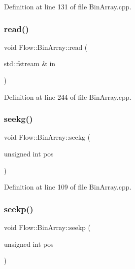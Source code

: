Definition at line 131 of file Bin\+Array.\+cpp.

\hypertarget{class_flow_1_1_bin_array_aa27012674a47706286b91b827599df43}{}\label{class_flow_1_1_bin_array_aa27012674a47706286b91b827599df43} 
\subsubsection{\texorpdfstring{read()}{read()}}
{\footnotesize\ttfamily void Flow\+::\+Bin\+Array\+::read (\begin{DoxyParamCaption}\item[{std\+::fstream \&}]{in }\end{DoxyParamCaption})}



Definition at line 244 of file Bin\+Array.\+cpp.

\hypertarget{class_flow_1_1_bin_array_a81034d4e23c65e830ac7126e2a715097}{}\label{class_flow_1_1_bin_array_a81034d4e23c65e830ac7126e2a715097} 
\subsubsection{\texorpdfstring{seekg()}{seekg()}}
{\footnotesize\ttfamily void Flow\+::\+Bin\+Array\+::seekg (\begin{DoxyParamCaption}\item[{unsigned int}]{pos }\end{DoxyParamCaption})}



Definition at line 109 of file Bin\+Array.\+cpp.

\hypertarget{class_flow_1_1_bin_array_a5d04d9154c3c9d7e48bdac55d9492072}{}\label{class_flow_1_1_bin_array_a5d04d9154c3c9d7e48bdac55d9492072} 
\subsubsection{\texorpdfstring{seekp()}{seekp()}}
{\footnotesize\ttfamily void Flow\+::\+Bin\+Array\+::seekp (\begin{DoxyParamCaption}\item[{unsigned int}]{pos }\end{DoxyParamCaption})}



